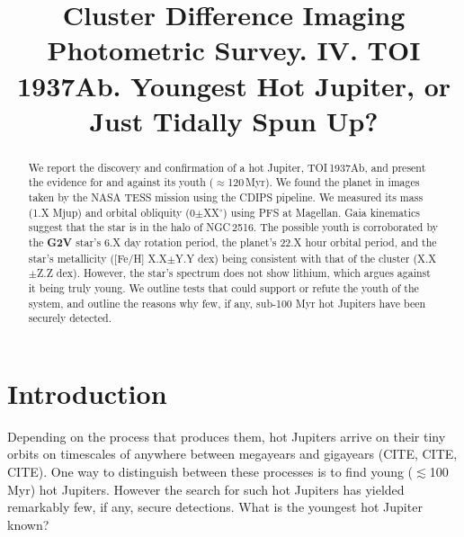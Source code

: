 \documentclass[12pt,twocolumn,tighten]{aastex63}
\begin{document}

\title{
  Cluster Difference Imaging Photometric Survey. IV.
  TOI 1937Ab. Youngest Hot Jupiter, or Just Tidally Spun Up?
}



\begin{abstract}
  We report the discovery and confirmation of a hot Jupiter,
  TOI\,1937Ab, and present the evidence for and against its youth
  ($\approx$120\,Myr).
  We found the planet in images taken by the NASA TESS mission
  using the CDIPS pipeline.
  We measured its mass (1.X Mjup) and orbital obliquity
  (0$\pm$XX$^\circ$) using PFS at Magellan.
  Gaia kinematics suggest that the star is in the halo of NGC\,2516.
  The possible youth is corroborated by the {\bf G2V} star's 6.X day
  rotation period, the planet's 22.X hour orbital period, and the
  star's metallicity ([Fe/H] X.X$\pm$Y.Y dex) being consistent with
  that of the cluster (X.X$\pm$Z.Z dex).
  However, the star's spectrum does not show lithium, which argues
  against it being truly young.
  We outline tests that could support or refute the youth of the
  system, and outline the reasons why few, if any, sub-100 Myr hot
  Jupiters have been securely detected.
\end{abstract}




\section{Introduction}

Depending on the process that produces them, hot Jupiters arrive on
their tiny orbits on timescales of anywhere between megayears and
gigayears (CITE, CITE, CITE).
One way to distinguish between these processes is to find
young ($\lesssim$100\,Myr) hot Jupiters.
However the search for such hot Jupiters has yielded remarkably few,
if any, secure detections.
What is the youngest hot Jupiter known?
\end{document}

